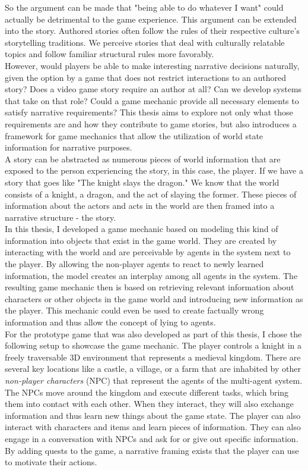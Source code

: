 So the argument can be made that "being able to do whatever I want" could actually be detrimental to the game experience. This argument can be extended into the story. Authored stories often follow the rules of their respective culture's storytelling traditions. We perceive stories that deal with culturally relatable topics and follow familiar structural rules more favorably.~\cite{Cooney2017}\\
However, would players be able to make interesting narrative decisions naturally, given the option by a game that does not restrict interactions to an authored story? Does a video game story require an author at all? Can we  develop systems that take on that role? Could a game mechanic provide all necessary elements to satisfy narrative requirements? This thesis aims to explore not only what those requirements are and how they contribute to game stories, but also introduces a framework for game mechanics that allow the utilization of world state information for narrative purposes.\\
A story can be abstracted as numerous pieces of world information that are exposed to the person experiencing the story, in this case, the player. If we have a story that goes like "The knight slays the dragon." We know that the world consists of a knight, a dragon, and the act of slaying the former. These pieces of information about the actors and acts in the world are then framed into a narrative structure - the story.\\
In this thesis, I developed a game mechanic based on modeling this kind of information into objects that exist in the game world. They are created by interacting with the world and are perceivable by agents in the system next to the player. By allowing the non-player agents to react to newly learned information, the model creates an interplay among all agents in the system. The resulting game mechanic then is based on retrieving relevant information about characters or other objects in the game world and introducing new information as the player. This mechanic could even be used to create factually wrong information and thus allow the concept of lying to agents.\\
For the prototype game that was also developed as part of this thesis, I chose the following setup to showcase the game mechanic. The player controls a knight in a freely traversable 3D environment that represents a medieval kingdom. There are several key locations like a castle, a village, or a farm that are inhabited by other \textit{non-player characters} (NPC) that represent the agents of the multi-agent system. The NPCs move around the kingdom and execute different tasks, which bring them into contact with each other. When they interact, they will also exchange information and thus learn new things about the game state. The player can also interact with characters and items and learn pieces of information. They can also engage in a conversation with NPCs and ask for or give out specific information. By adding quests to the game, a narrative framing exists that the player can use to motivate their actions.\\
